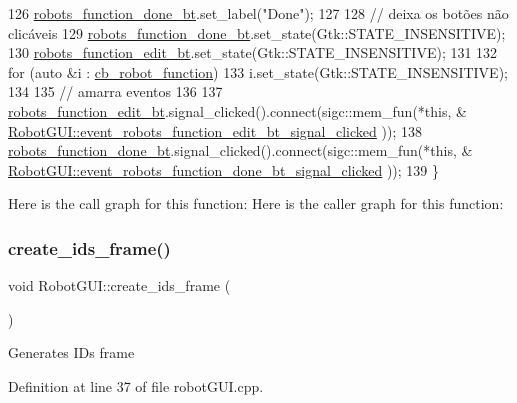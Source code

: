 \begin{DoxyCode}
126     \hyperlink{class_robot_g_u_i_a17db9c0ad94bd601734b87c6aff3fcf0}{robots\_function\_done\_bt}.set\_label(\textcolor{stringliteral}{"Done"});
127 
128     \textcolor{comment}{// deixa os botões não clicáveis}
129     \hyperlink{class_robot_g_u_i_a17db9c0ad94bd601734b87c6aff3fcf0}{robots\_function\_done\_bt}.set\_state(Gtk::STATE\_INSENSITIVE);
130     \hyperlink{class_robot_g_u_i_ac474c7d61bd07aaf26f75acb691e2971}{robots\_function\_edit\_bt}.set\_state(Gtk::STATE\_INSENSITIVE);
131 
132     \textcolor{keywordflow}{for} (\textcolor{keyword}{auto} &i : \hyperlink{class_robot_g_u_i_ab1e977d6ae4bcf57e4306f017695eeeb}{cb\_robot\_function})
133         i.set\_state(Gtk::STATE\_INSENSITIVE);
134 
135     \textcolor{comment}{// amarra eventos}
136 
137     \hyperlink{class_robot_g_u_i_ac474c7d61bd07aaf26f75acb691e2971}{robots\_function\_edit\_bt}.signal\_clicked().connect(sigc::mem\_fun(*\textcolor{keyword}{this}, &
      \hyperlink{class_robot_g_u_i_a7b15515d7ea036f2b59d62bc6cdc476b}{RobotGUI::event\_robots\_function\_edit\_bt\_signal\_clicked}
      ));
138     \hyperlink{class_robot_g_u_i_a17db9c0ad94bd601734b87c6aff3fcf0}{robots\_function\_done\_bt}.signal\_clicked().connect(sigc::mem\_fun(*\textcolor{keyword}{this}, &
      \hyperlink{class_robot_g_u_i_a772f8b103a92bc866827c5553451120e}{RobotGUI::event\_robots\_function\_done\_bt\_signal\_clicked}
      ));
139 \}
\end{DoxyCode}
Here is the call graph for this function\+:
Here is the caller graph for this function\+:
\mbox{\label{class_robot_g_u_i_a0aa53fbc31e2740779cb078f440a4891}} 
\subsubsection{\texorpdfstring{create\+\_\+ids\+\_\+frame()}{create\_ids\_frame()}}
{\footnotesize\ttfamily void Robot\+G\+U\+I\+::create\+\_\+ids\+\_\+frame (\begin{DoxyParamCaption}{ }\end{DoxyParamCaption})\hspace{0.3cm}{\ttfamily [private]}}

Generates I\+Ds frame 

Definition at line 37 of file robot\+G\+U\+I.\+cpp.




